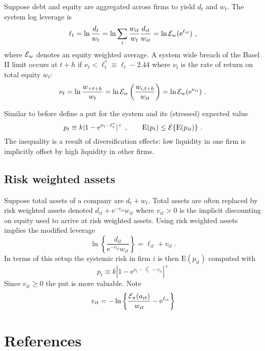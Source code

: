 \documentclass[authoryear]{elsarticle}
\newcommand{\E}{\mathrm{E}}
\newcommand{\e}{\mathrm{e}}
\newcommand{\Ex}{{\cal E}}
\newcommand{\cq}{\ , \qquad}
\newcommand{\be}[1]{\begin{equation}\label{#1}}
\newcommand{\ee}{\end{equation}}
\begin{document}
Suppose debt and equity are  aggregated across firms to yield $d_t$ and $w_t$.  The system log leverage is  
$$
\ell_t =  \ln \frac{d_t}{w_t} =  \ln \sum_i\frac{w_{it}}{w_t}\frac{ d_{it}}{ w_{it}} = \ln \Ex_w(\e^{\ell_{it}}) \ ,
$$
where $\Ex_w$ denotes an equity weighted average.  A system wide breach of the Basel II limit occurs at $t+h$ if
$
\nu_t < \ell_t^*\equiv \ell_t - 2.44
$
where $\nu_t$ is the rate of return on total equity $w_t$:
\be{ew}
 \nu_t = \ln \frac{w_{+t+h}}{w_t} = \ln \Ex_w\left(\frac{w_{i,t+h}}{w_{it}}\right) = \ln \Ex_w(\e^{\nu_{it}})\ . 
\ee

Similar to before define a put for the system and its (stressed) expected value
$$
p_t\equiv k|1-\e^{\nu_t-\ell_t^*}|^+\cq \E(p_t)\le\Ex\{\E(p_{it})\}\ .
$$
The inequality is a result  of diversification effects:   low liquidity  in one firm is implicitly offset by high liquidity  in other  firms.

\subsection{Risk weighted assets}

Suppose total assets of a company are $d_t+w_t$.   Total assets are often replaced by  risk weighted assets denoted $d_{it}+\e^{-v_{it}}w_{it}$ where $v_{it}>0$ is the implicit discounting on equity used to arrive at risk weighted assets.  
  Using risk weighted assets implies the modified leverage
$$
 \ln\left\{ \frac{d_{it}}{\e^{-v_{it}}w_{it}}\right\}=\ell_{it} +v_{it}\ .
$$
In terms of this setup the systemic risk in firm $i$ is then $\E(p_{it})$ computed with 
$$
p_{t}\equiv  k|1-\e^{\nu_{t}-\ell^*_{t}-v_{it}}|^+
$$
Since $v_{it}\ge 0$ the put is more valuable.   Note 
$$
v_{it} =-\ln\left\{ \frac{\Ex_\pi(a_{it})}{w_{it}} - \e^{\ell_{it}}\right\}
$$

\section*{References}

\end{document}

